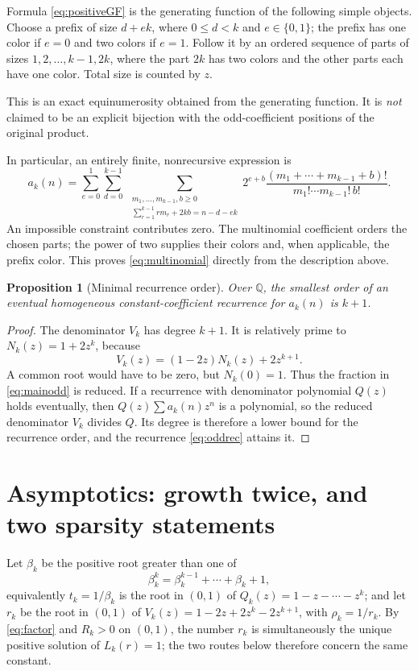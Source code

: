 \documentclass[11pt,letterpaper]{article}
\numberwithin{equation}{section}
\newtheorem{proposition}[theorem]{Proposition}
\theoremstyle{definition}
\theoremstyle{remark}
\newcommand{\Q}{\mathbb Q}
\begin{document}
Formula \eqref{eq:positiveGF} is the generating function of the following
simple objects. Choose a prefix of size $d+ek$, where $0\le d<k$ and
$e\in\{0,1\}$; the prefix has one color if $e=0$ and two colors if $e=1$.
Follow it by an ordered sequence of parts of sizes $1,2,\ldots,k-1,2k$,
where the part $2k$ has two colors and the other parts each have one color.
Total size is counted by $z$.

This is an exact equinumerosity obtained from the generating function. It
is \emph{not} claimed to be an explicit bijection with the odd-coefficient
positions of the original product.

In particular, an entirely finite, nonrecursive expression is
\begin{equation}
 a_k(n)=\sum_{e=0}^1\sum_{d=0}^{k-1}
 \ \sum_{\substack{m_1,\ldots,m_{k-1},b\ge0\\
 \sum_{r=1}^{k-1}r m_r+2kb=n-d-ek}}
 2^{e+b}\frac{(m_1+\cdots+m_{k-1}+b)!}{m_1!\cdots m_{k-1}!\,b!} .
 \label{eq:multinomial}
\end{equation}
An impossible constraint contributes zero. The multinomial coefficient
orders the chosen parts; the power of two supplies their colors and, when
applicable, the prefix color. This proves \eqref{eq:multinomial} directly
from the description above.

\begin{proposition}[Minimal recurrence order]
\label{prop:minimal}
Over $\Q$, the smallest order of an eventual homogeneous
constant-coefficient recurrence for $a_k(n)$ is $k+1$.
\end{proposition}
\begin{proof}
The denominator $V_k$ has degree $k+1$. It is relatively prime to
$N_k(z)=1+2z^k$, because
\[
 V_k(z)=(1-2z)N_k(z)+2z^{k+1}.
\]
A common root would have to be zero, but $N_k(0)=1$. Thus the fraction in
\eqref{eq:mainodd} is reduced. If a recurrence with denominator polynomial
$Q(z)$ holds eventually, then $Q(z)\sum a_k(n)z^n$ is a polynomial, so the
reduced denominator $V_k$ divides $Q$. Its degree is therefore a lower
bound for the recurrence order, and the recurrence \eqref{eq:oddrec}
attains it.
\end{proof}

\section{Asymptotics: growth twice, and two sparsity statements}
\label{sec:asymptotic}

Let $\beta_k$ be the positive root greater than one of
\begin{equation}
 \beta_k^k=\beta_k^{k-1}+\cdots+\beta_k+1,
 \label{eq:beta}
\end{equation}
equivalently $t_k=1/\beta_k$ is the root in $(0,1)$ of
$Q_k(z)=1-z-\cdots-z^k$; and let $r_k$ be the root in $(0,1)$ of
$V_k(z)=1-2z+2z^k-2z^{k+1}$, with $\rho_k=1/r_k$. By \eqref{eq:factor} and
$R_k>0$ on $(0,1)$, the number $r_k$ is simultaneously the unique positive
solution of $L_k(r)=1$; the two routes below therefore concern the same
constant.
\end{document}
